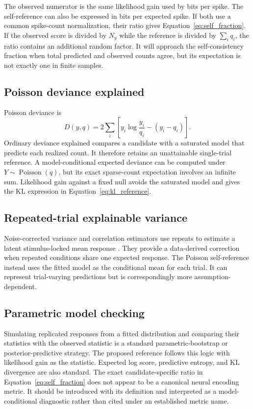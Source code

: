 \documentclass[11pt]{article}
\newcommand{\Pois}{\operatorname{Poisson}}
\begin{document}
The observed numerator is the same likelihood gain used by bits per spike. The self-reference can also be expressed in bits per expected spike. If both use a common spike-count normalization, their ratio gives Equation~\ref{eq:self_fraction}. If the observed score is divided by $N_y$ while the reference is divided by $\sum_iq_i$, the ratio contains an additional random factor. It will approach the self-consistency fraction when total predicted and observed counts agree, but its expectation is not exactly one in finite samples.

\subsection{Poisson deviance explained}

Poisson deviance is
\begin{equation}
D(y,q)
=2\sum_i
\left[
 y_i\log\frac{y_i}{q_i}-(y_i-q_i)
\right].
\end{equation}
Ordinary deviance explained compares a candidate with a saturated model that predicts each realized count. It therefore retains an unattainable single-trial reference. A model-conditional expected deviance can be computed under $Y\sim\Pois(q)$, but its exact sparse-count expectation involves an infinite sum. Likelihood gain against a fixed null avoids the saturated model and gives the KL expression in Equation~\ref{eq:kl_reference}.

\subsection{Repeated-trial explainable variance}

Noise-corrected variance and correlation estimators use repeats to estimate a latent stimulus-locked mean response \cite{schoppe2016,pospisil2021}. They provide a data-derived correction when repeated conditions share one expected response. The Poisson self-reference instead uses the fitted model as the conditional mean for each trial. It can represent trial-varying predictions but is correspondingly more assumption-dependent.

\subsection{Parametric model checking}

Simulating replicated responses from a fitted distribution and comparing their statistics with the observed statistic is a standard parametric-bootstrap or posterior-predictive strategy. The proposed reference follows this logic with likelihood gain as the statistic. Expected log score, predictive entropy, and KL divergence are also standard. The exact candidate-specific ratio in Equation~\ref{eq:self_fraction} does not appear to be a canonical neural encoding metric. It should be introduced with its definition and interpreted as a model-conditional diagnostic rather than cited under an established metric name.
\end{document}

